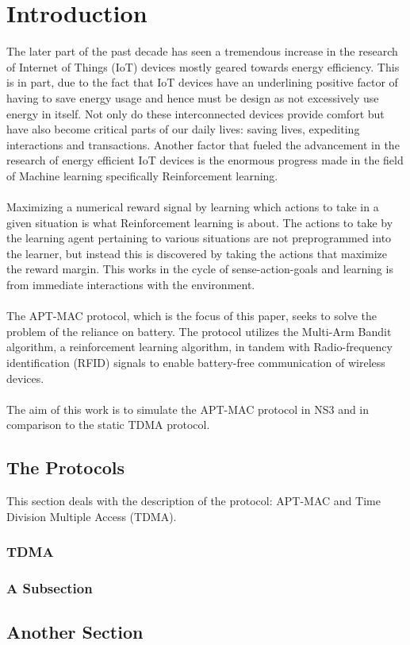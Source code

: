 \chapter{Introduction}

The later part of the past decade has seen a tremendous increase in the research of Internet of Things (IoT) devices mostly geared towards energy efficiency.
This is in part, due to the fact that IoT devices have an underlining positive factor of having to save energy usage and hence must be design as not excessively use energy in itself.
Not only do these interconnected devices provide comfort but have also become critical parts of our daily lives: saving lives, expediting interactions and transactions.
Another factor that fueled the advancement in the research of energy efficient IoT devices is the enormous progress made in the field of Machine learning specifically Reinforcement learning.\\\\
Maximizing a numerical reward signal by learning which actions to take in a given situation is what Reinforcement learning is about.
The actions to take by the learning agent pertaining to various situations are not preprogrammed into the learner, but instead this is discovered by taking the actions that maximize the reward margin\cite{Sutton&Barto}. This works in the cycle of sense-action-goals and learning is from immediate interactions with the environment.\\\\
The APT-MAC protocol, which is the focus of this paper, seeks to solve the problem of the reliance on battery.
The protocol utilizes the Multi-Arm Bandit algorithm, a reinforcement learning algorithm, in tandem with Radio-frequency identification (RFID) signals to enable battery-free communication of wireless devices\cite{Maselli}.\\\\
The aim of this work is to simulate the APT-MAC protocol in NS3 and in comparison to the static TDMA protocol.

\section{The Protocols}
This section deals with the description of the protocol: APT-MAC and Time Division Multiple Access (TDMA).

\subsection{TDMA}




\subsection{A Subsection}


\section{Another Section}


